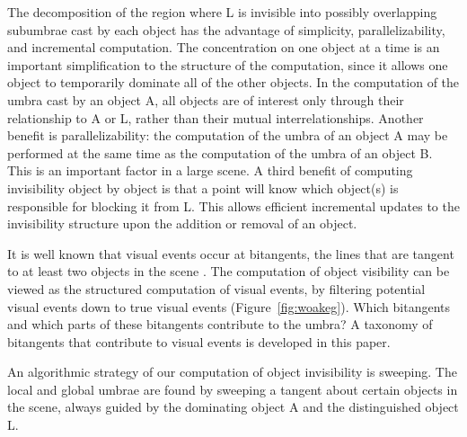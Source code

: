 \documentclass[9pt,twocolumn]{article}
\newif\ifJournal
\begin{document}

The decomposition of the region where L is invisible
into possibly overlapping subumbrae cast by each object has the advantage
of simplicity, parallelizability, and incremental computation.
The concentration on one object at a time is
an important simplification to the structure of the computation,
since it allows one object to temporarily dominate all of the other objects.
In the computation of the umbra cast by an object A, 
all objects are of interest only through their relationship
to A or L, rather than their mutual interrelationships.
Another benefit is parallelizability:
the computation of the umbra of an object A may be performed at the same
time as the computation of the umbra of an object B.
This is an important factor in a large scene.
A third benefit of computing invisibility object by object
is that a point will know which object(s) is
responsible for blocking it from L.
This allows efficient incremental updates to the invisibility structure upon the addition
or removal of an object.

It is well known that visual events occur at bitangents,
the lines that are tangent to at least two objects in the scene \cite{durand00a}.
The computation of object visibility can be viewed as the structured computation
of visual events, by filtering 
potential visual events down to true visual events (Figure~\ref{fig:woakeg}).
Which bitangents and which parts of these bitangents contribute to the umbra?
A taxonomy of bitangents that contribute to visual events is developed in this paper.
\ifJournal
An {\bf umbral bitangent} is a bitangent that contributes to the boundary of the umbra.
A {\bf penumbral bitangent} is a bitangent that contributes to the boundary of the penumbra.
\fi
An algorithmic strategy of our computation of object invisibility is sweeping.
The local and global umbrae are found by sweeping a tangent about
certain objects in the scene, always guided by the dominating object A
and the distinguished object L.
\end{document}
